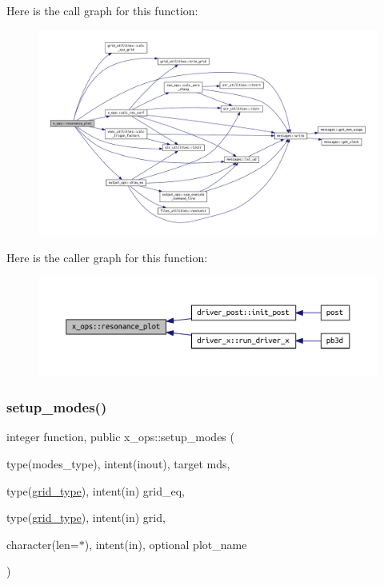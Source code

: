 Here is the call graph for this function\+:\nopagebreak
\begin{figure}[H]
\begin{center}
\leavevmode
\includegraphics[width=350pt]{namespacex__ops_abdaf1308e13cede3a153e8c6cf35a637_cgraph}
\end{center}
\end{figure}
Here is the caller graph for this function\+:\nopagebreak
\begin{figure}[H]
\begin{center}
\leavevmode
\includegraphics[width=350pt]{namespacex__ops_abdaf1308e13cede3a153e8c6cf35a637_icgraph}
\end{center}
\end{figure}
\mbox{\label{namespacex__ops_a640d64aeae8a574eb05f164c1bdad3bd}} 
\subsubsection{\texorpdfstring{setup\+\_\+modes()}{setup\_modes()}}
{\footnotesize\ttfamily integer function, public x\+\_\+ops\+::setup\+\_\+modes (\begin{DoxyParamCaption}\item[{type(modes\+\_\+type), intent(inout), target}]{mds,  }\item[{type(\hyperlink{structgrid__vars_1_1grid__type}{grid\+\_\+type}), intent(in)}]{grid\+\_\+eq,  }\item[{type(\hyperlink{structgrid__vars_1_1grid__type}{grid\+\_\+type}), intent(in)}]{grid,  }\item[{character(len=$\ast$), intent(in), optional}]{plot\+\_\+name }\end{DoxyParamCaption})}




